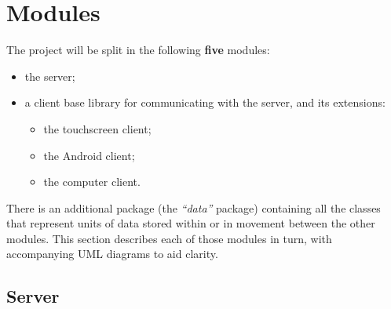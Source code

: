 \documentclass[12p, a4paper, onecolumn]{report}
\begin{document}
\section{Modules}

The project will be split in the following \textbf{five} modules:
\begin{itemize}
\item the server;
\item a client base library for communicating with the server, and its extensions:
\begin{itemize}
  \item the touchscreen client;
  \item the Android client;
  \item the computer client.
\end{itemize}
\end{itemize}
There is an additional package (the \emph{“data”} package) containing all the classes that represent units of data stored within or in movement between the other modules. This section describes each of those modules in turn, with accompanying UML diagrams to aid clarity.

\subsection{Server}
\end{document}
